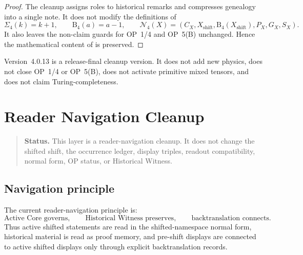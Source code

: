 \begin{proof}
The cleanup assigns roles to historical remarks and compresses genealogy into a
single note. It does not modify the definitions of
\[
 \Sigma_4(k)=k+1,\qquad
 \mathrm B_4(a)=a-1,\qquad
 \mathcal N_4(X)=(C_X,X_{\mathrm{shift}},\mathrm B_4(X_{\mathrm{shift}}),P_X,G_X,S_X).
\]
It also leaves the non-claim guards for OP~1/4 and OP~5(B) unchanged. Hence
the mathematical content of  is preserved.
\end{proof}

\begin{remark}
\label{rem:v401-non-claim}
Version~4.0.13 is a release-final cleanup version. It does not add new physics, does not
close OP~1/4 or OP~5(B), does not activate primitive mixed tensors, and does
not claim Turing-completeness.
\end{remark}



\clearpage
\section{ Reader Navigation Cleanup}
\label{sec:v402-reader-navigation-cleanup}

\begin{quote}\small
\noindent\textbf{Status.}
This  layer is a reader-navigation cleanup. It does not change the shifted
shift, the occurrence ledger, display triples, readout compatibility, normal
form, OP status, or Historical Witness.
\end{quote}

\subsection{Navigation principle}
\label{subsec:v402-navigation-principle}

\begin{definition}
\label{def:v402-current-reader-navigation-principle}
The current reader-navigation principle is:
\[
 \text{Active Core governs},\qquad
 \text{Historical Witness preserves},\qquad
 \text{backtranslation connects}.
\]
Thus active shifted statements are read in the shifted-namespace normal form, historical material is
read as proof memory, and pre-shift displays are connected to active shifted displays
only through explicit backtranslation records.
\end{definition}

